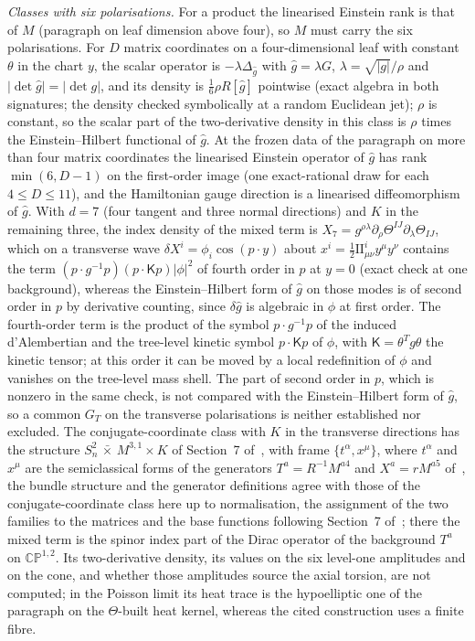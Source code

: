 \emph{Classes with six polarisations.} For a product the linearised Einstein rank is that of \(M\) (paragraph on leaf dimension above four), so \(M\) must carry the six polarisations. For \(D\) matrix coordinates on a four-dimensional leaf with constant \(\theta\) in the chart \(y\), the scalar operator is \(-\lambda\Delta_{\hat g}\) with \(\hat g=\lambda G\), \(\lambda=\sqrt{\lvert g\rvert}/\rho\) and \(\lvert\det\hat g\rvert=\lvert\det g\rvert\), and its density is \(\tfrac16\rho R[\hat g]\) pointwise (exact algebra in both signatures; the density checked symbolically at a random Euclidean jet); \(\rho\) is constant, so the scalar part of the two-derivative density in this class is \(\rho\) times the Einstein--Hilbert functional of \(\hat g\). At the frozen data of the paragraph on more than four matrix coordinates the linearised Einstein operator of \(\hat g\) has rank \(\min(6,D-1)\) on the first-order image (one exact-rational draw for each \(4\le D\le11\)), and the Hamiltonian gauge direction is a linearised diffeomorphism of \(\hat g\). With \(d=7\) (four tangent and three normal directions) and \(K\) in the remaining three, the index density of the mixed term is \(X_7=g^{\rho\lambda}\partial_\rho\Theta^{IJ}\partial_\lambda\Theta_{IJ}\), which on a transverse wave \(\delta X^i=\phi_i\cos(p\cdot y)\) about \(x^i=\tfrac12\mathrm{II}^i_{\mu\nu}y^\mu y^\nu\) contains the term \((p\cdot g^{-1}p)(p\cdot\mathsf Kp)\lvert\phi\rvert^2\) of fourth order in \(p\) at \(y=0\) (exact check at one background), whereas the Einstein--Hilbert form of \(\hat g\) on those modes is of second order in \(p\) by derivative counting, since \(\delta\hat g\) is algebraic in \(\phi\) at first order. The fourth-order term is the product of the symbol \(p\cdot g^{-1}p\) of the induced d'Alembertian and the tree-level kinetic symbol \(p\cdot\mathsf K p\) of \(\phi\), with \(\mathsf K=\theta^{T}g\theta\) the kinetic tensor; at this order it can be moved by a local redefinition of \(\phi\) and vanishes on the tree-level mass shell. The part of second order in \(p\), which is nonzero in the same check, is not compared with the Einstein--Hilbert form of \(\hat g\), so a common \(G_T\) on the transverse polarisations is neither established nor excluded. The conjugate-coordinate class with \(K\) in the transverse directions has the structure \(S^2_n\,\bar\times\,M^{3,1}\times K\) of Section~7 of~\cite{Steinacker2023}, with frame \(\{t^\alpha,x^\mu\}\), where \(t^\alpha\) and \(x^\mu\) are the semiclassical forms of the generators \(T^a=R^{-1}M^{a4}\) and \(X^a=rM^{a5}\) of~\cite{SperlingSteinacker2019}, the bundle structure and the generator definitions agree with those of the conjugate-coordinate class here up to normalisation, the assignment of the two families to the matrices and the base functions following Section~7 of~\cite{Steinacker2023}; there the mixed term is the spinor index part of the Dirac operator of the background \(T^a\) on \(\mathbb{CP}^{1,2}\). Its two-derivative density, its values on the six level-one amplitudes and on the cone, and whether those amplitudes source the axial torsion, are not computed; in the Poisson limit its heat trace is the hypoelliptic one of the paragraph on the \(\Theta\)-built heat kernel, whereas the cited construction uses a finite fibre.

